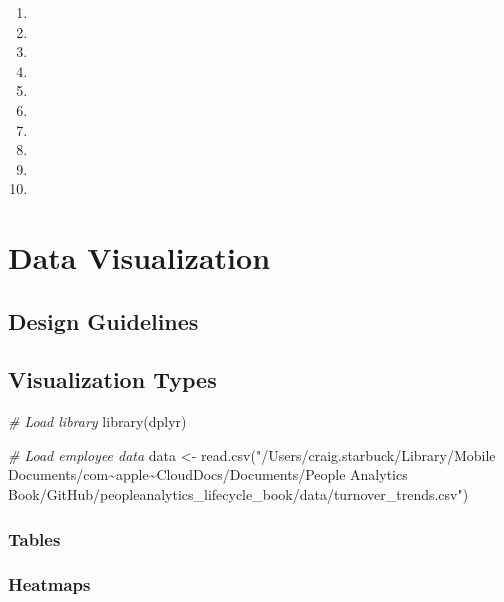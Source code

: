 \documentclass[
]{book}
\newenvironment{Shaded}{\begin{snugshade}}{\end{snugshade}}
\newcommand{\CommentTok}[1]{\textcolor[rgb]{0.56,0.35,0.01}{\textit{#1}}}
\newcommand{\FunctionTok}[1]{\textcolor[rgb]{0.00,0.00,0.00}{#1}}
\newcommand{\NormalTok}[1]{#1}
\newcommand{\OtherTok}[1]{\textcolor[rgb]{0.56,0.35,0.01}{#1}}
\newcommand{\StringTok}[1]{\textcolor[rgb]{0.31,0.60,0.02}{#1}}
\providecommand{\tightlist}{%
  \setlength{\itemsep}{0pt}\setlength{\parskip}{0pt}}
\begin{document}
\begin{enumerate}
\def\labelenumi{\arabic{enumi}.}
\tightlist
\item
\item
\item
\item
\item
\item
\item
\item
\item
\item
\end{enumerate}

\hypertarget{data-viz}{%
\chapter{Data Visualization}\label{data-viz}}

\hypertarget{design-guidelines}{%
\section{Design Guidelines}\label{design-guidelines}}

\hypertarget{visualization-types}{%
\section{Visualization Types}\label{visualization-types}}

\begin{Shaded}
\begin{Highlighting}[]
\CommentTok{\# Load library}
\FunctionTok{library}\NormalTok{(dplyr)}

\CommentTok{\# Load employee data}
\NormalTok{data }\OtherTok{\textless{}{-}} \FunctionTok{read.csv}\NormalTok{(}\StringTok{"/Users/craig.starbuck/Library/Mobile Documents/com\textasciitilde{}apple\textasciitilde{}CloudDocs/Documents/People Analytics Book/GitHub/peopleanalytics\_lifecycle\_book/data/turnover\_trends.csv"}\NormalTok{)}
\end{Highlighting}
\end{Shaded}

\hypertarget{tables}{%
\subsection{Tables}\label{tables}}

\hypertarget{heatmaps}{%
\subsection{Heatmaps}\label{heatmaps}}
\end{document}

